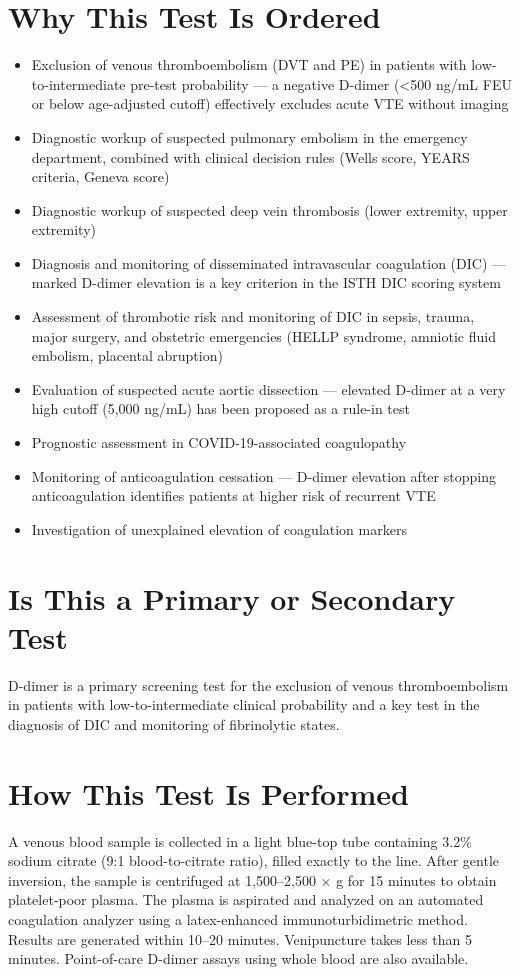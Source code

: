 \section*{Why This Test Is Ordered}
\begin{itemize}
  \item Exclusion of venous thromboembolism (DVT and PE) in patients with low-to-intermediate pre-test probability --- a negative D-dimer (<500 ng/mL FEU or below age-adjusted cutoff) effectively excludes acute VTE without imaging
  \item Diagnostic workup of suspected pulmonary embolism in the emergency department, combined with clinical decision rules (Wells score, YEARS criteria, Geneva score)
  \item Diagnostic workup of suspected deep vein thrombosis (lower extremity, upper extremity)
  \item Diagnosis and monitoring of disseminated intravascular coagulation (DIC) --- marked D-dimer elevation is a key criterion in the ISTH DIC scoring system
  \item Assessment of thrombotic risk and monitoring of DIC in sepsis, trauma, major surgery, and obstetric emergencies (HELLP syndrome, amniotic fluid embolism, placental abruption)
  \item Evaluation of suspected acute aortic dissection --- elevated D-dimer at a very high cutoff (5,000 ng/mL) has been proposed as a rule-in test
  \item Prognostic assessment in COVID-19-associated coagulopathy
  \item Monitoring of anticoagulation cessation --- D-dimer elevation after stopping anticoagulation identifies patients at higher risk of recurrent VTE
  \item Investigation of unexplained elevation of coagulation markers
\end{itemize}

\section*{Is This a Primary or Secondary Test}
D-dimer is a primary screening test for the exclusion of venous thromboembolism in patients with low-to-intermediate clinical probability and a key test in the diagnosis of DIC and monitoring of fibrinolytic states.

\section*{How This Test Is Performed}
A venous blood sample is collected in a light blue-top tube containing 3.2\% sodium citrate (9:1 blood-to-citrate ratio), filled exactly to the line. After gentle inversion, the sample is centrifuged at 1,500--2,500 $\times$ g for 15 minutes to obtain platelet-poor plasma. The plasma is aspirated and analyzed on an automated coagulation analyzer using a latex-enhanced immunoturbidimetric method. Results are generated within 10--20 minutes. Venipuncture takes less than 5 minutes. Point-of-care D-dimer assays using whole blood are also available.

